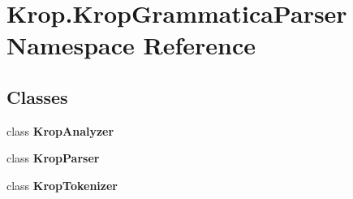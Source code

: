 \hypertarget{namespace_krop_1_1_krop_grammatica_parser}{}\section{Krop.\+Krop\+Grammatica\+Parser Namespace Reference}
\label{namespace_krop_1_1_krop_grammatica_parser}
\subsection*{Classes}
\begin{DoxyCompactItemize}
\item 
class {\bfseries Krop\+Analyzer}
\item 
class {\bfseries Krop\+Parser}
\item 
class {\bfseries Krop\+Tokenizer}
\end{DoxyCompactItemize}
